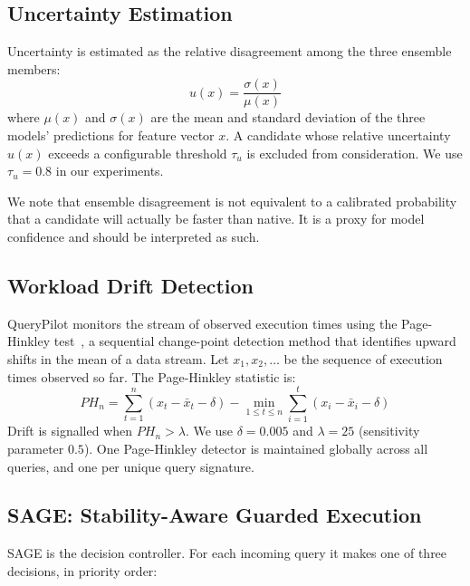 \documentclass[conference]{IEEEtran}
\begin{document}
\subsection*{Uncertainty Estimation}
Uncertainty is estimated as the relative disagreement among the three ensemble
members:
\[
u(x) = \frac{\sigma(x)}{\mu(x)}
\]
where $\mu(x)$ and $\sigma(x)$ are the mean and standard deviation of the
three models' predictions for feature vector $x$. A candidate whose relative
uncertainty $u(x)$ exceeds a configurable threshold $\tau_u$ is excluded from
consideration. We use $\tau_u = 0.8$ in our experiments.

We note that ensemble disagreement is not equivalent to a calibrated
probability that a candidate will actually be faster than native. It is a
proxy for model confidence and should be interpreted as such.

\subsection*{Workload Drift Detection}
QueryPilot monitors the stream of observed execution times using the
Page-Hinkley test~\cite{b7}, a sequential change-point detection method
that identifies upward shifts in the mean of a data stream. Let $x_1, x_2,
\ldots$ be the sequence of execution times observed so far. The Page-Hinkley
statistic is:
\[
PH_n = \sum_{t=1}^{n} (x_t - \bar{x}_t - \delta) - \min_{1 \le t \le n}
\sum_{i=1}^{t} (x_i - \bar{x}_i - \delta)
\]
Drift is signalled when $PH_n > \lambda$. We use $\delta = 0.005$ and
$\lambda = 25$ (sensitivity parameter $0.5$). One Page-Hinkley detector is
maintained globally across all queries, and one per unique query signature.

\subsection*{SAGE: Stability-Aware Guarded Execution}
SAGE is the decision controller. For each incoming query it makes one of three
decisions, in priority order:
\end{document}
